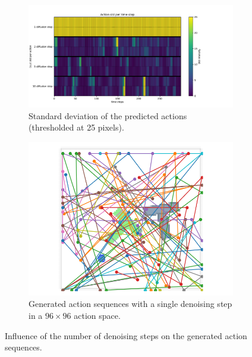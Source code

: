 \begin{figure}[!htb]
    \begin{subfigure}[b]{0.65\linewidth}
        \centering
        \includegraphics[width=\linewidth]{figures/plot_heatmap.pdf}
        \caption{Standard deviation of the predicted actions (thresholded at 25 pixels).}
        \label{fig:heatmap_denoising_steps}
    \end{subfigure}
    \begin{subfigure}[b]{0.34\linewidth}
        \centering
        \includegraphics[width=\linewidth]{figures/random_actions.png}
        \caption{Generated action sequences with a single denoising step in a $96 \times 96$ action space.}
        \label{fig:single_denoising_step}
    \end{subfigure}
    \caption{Influence of the number of denoising steps on the generated action sequences.}
    \label{fig:number_denoising_steps}
\end{figure}

